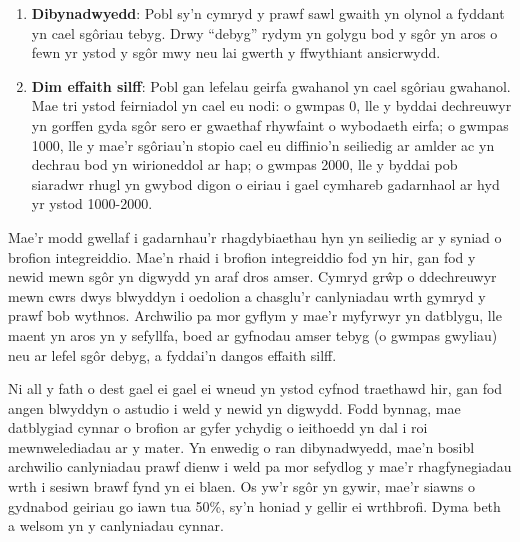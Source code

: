 \begin{enumerate}
  \item \textbf{Dibynadwyedd}: Pobl sy'n cymryd y prawf sawl gwaith yn olynol a fyddant yn cael sgôriau tebyg. Drwy ``debyg'' rydym yn golygu bod y sgôr yn aros o fewn yr ystod y sgôr mwy neu lai gwerth y ffwythiant ansicrwydd.
  \item \textbf{Dim effaith silff}: Pobl gan lefelau geirfa gwahanol yn cael sgôriau gwahanol. Mae tri ystod feirniadol yn cael eu nodi: o gwmpas 0, lle y byddai dechreuwyr yn gorffen gyda sgôr sero er gwaethaf rhywfaint o wybodaeth eirfa; o gwmpas 1000, lle y mae'r sgôriau'n stopio cael eu diffinio'n seiliedig ar amlder ac yn dechrau bod yn wirioneddol ar hap; o gwmpas 2000, lle y byddai pob siaradwr rhugl yn gwybod digon o eiriau i gael cymhareb gadarnhaol ar hyd yr ystod 1000-2000.
\end{enumerate}

Mae'r modd gwellaf i gadarnhau'r rhagdybiaethau hyn yn seiliedig ar y syniad o brofion integreiddio. Mae'n rhaid i brofion integreiddio fod yn hir, gan fod y newid mewn sgôr yn digwydd yn araf dros amser. Cymryd grŵp o ddechreuwyr mewn cwrs dwys blwyddyn i oedolion a chasglu'r canlyniadau wrth gymryd y prawf bob wythnos. Archwilio pa mor gyflym y mae'r myfyrwyr yn datblygu, lle maent yn aros yn y sefyllfa, boed ar gyfnodau amser tebyg (o gwmpas gwyliau) neu ar lefel sgôr debyg, a fyddai'n dangos effaith silff.

Ni all y fath o dest gael ei gael ei wneud yn ystod cyfnod traethawd hir, gan fod angen blwyddyn o astudio i weld y newid yn digwydd. Fodd bynnag, mae datblygiad cynnar o brofion ar gyfer ychydig o ieithoedd yn dal i roi mewnwelediadau ar y mater. Yn enwedig o ran dibynadwyedd, mae'n bosibl archwilio canlyniadau prawf dienw i weld pa mor sefydlog y mae'r rhagfynegiadau wrth i sesiwn brawf fynd yn ei blaen. Os yw'r sgôr yn gywir, mae'r siawns o gydnabod geiriau go iawn tua 50\%, sy'n honiad y gellir ei wrthbrofi. Dyma beth a welsom yn y canlyniadau cynnar.

